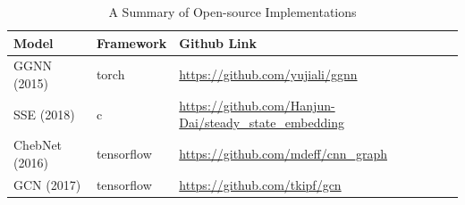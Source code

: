 \begin{table}
	\caption{A Summary of Open-source Implementations}
	\label{tab:codes}
	\centering
	\begin{tabular}{ l l l }
		\toprule
		Model & Framework & Github Link \\ \midrule
		GGNN (2015)      &    torch         &      \url{https://github.com/yujiali/ggnn}       \\ \hline
		SSE (2018)      &    c         &      \url{https://github.com/Hanjun-Dai/steady_state_embedding}       \\ \hline
		ChebNet (2016)   & tensorflow  &\url{https://github.com/mdeff/cnn_graph}    \\ \hline 
		GCN (2017) & tensorflow  &\url{https://github.com/tkipf/gcn}          \\ \hline
		

\end{tabular}
\end{table}
